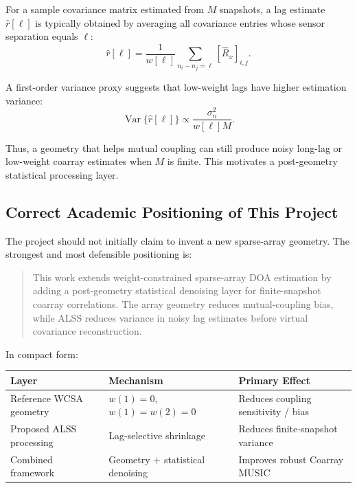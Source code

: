 \documentclass[11pt,letterpaper]{article}
\newcommand{\ALSS}{\textsc{ALSS}}
\begin{document}
For a sample covariance matrix estimated from $M$ snapshots, a lag estimate $\hat{r}[\ell]$ is typically obtained by averaging all covariance entries whose sensor separation equals $\ell$:
\begin{equation}
    \hat{r}[\ell] = \frac{1}{w[\ell]} \sum_{n_i-n_j=\ell} [\hat{R}_x]_{i,j} .
\end{equation}

A first-order variance proxy suggests that low-weight lags have higher estimation variance:
\begin{equation}
    \operatorname{Var}\{\hat{r}[\ell]\} \propto \frac{\sigma_n^2}{w[\ell]M} .
    \label{eq:variance_proxy}
\end{equation}

Thus, a geometry that helps mutual coupling can still produce noisy long-lag or low-weight coarray estimates when $M$ is finite. This motivates a post-geometry statistical processing layer.

\subsection{Correct Academic Positioning of This Project}

The project should not initially claim to invent a new sparse-array geometry. The strongest and most defensible positioning is:

\begin{quote}
This work extends weight-constrained sparse-array DOA estimation by adding a post-geometry statistical denoising layer for finite-snapshot coarray correlations. The array geometry reduces mutual-coupling bias, while \ALSS{} reduces variance in noisy lag estimates before virtual covariance reconstruction.
\end{quote}

In compact form:

\begin{center}
\begin{tabular}{lll}
\toprule
Layer & Mechanism & Primary Effect \\
\midrule
Reference WCSA geometry & $w(1)=0$, $w(1)=w(2)=0$ & Reduces coupling sensitivity / bias \\
Proposed \ALSS{} processing & Lag-selective shrinkage & Reduces finite-snapshot variance \\
Combined framework & Geometry $+$ statistical denoising & Improves robust Coarray MUSIC \\
\bottomrule
\end{tabular}
\end{center}
\end{document}
